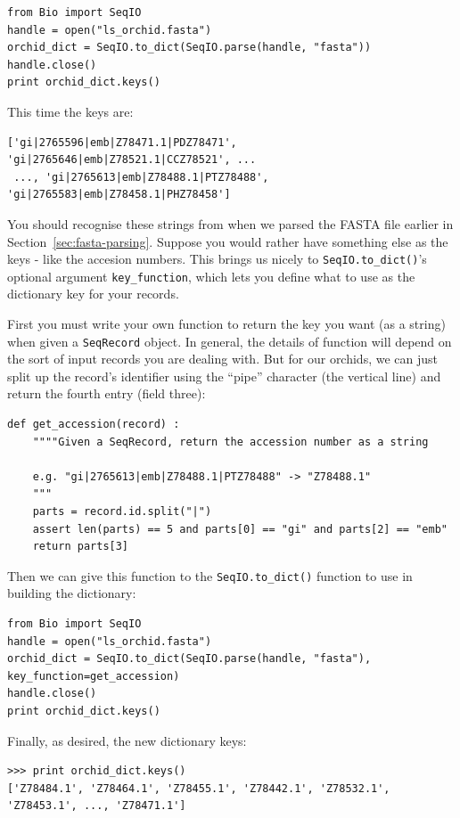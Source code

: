 \documentclass{report}
\begin{document}
\begin{verbatim}
from Bio import SeqIO
handle = open("ls_orchid.fasta")
orchid_dict = SeqIO.to_dict(SeqIO.parse(handle, "fasta"))
handle.close()
print orchid_dict.keys()
\end{verbatim}

\noindent This time the keys are:

\begin{verbatim}
['gi|2765596|emb|Z78471.1|PDZ78471', 'gi|2765646|emb|Z78521.1|CCZ78521', ...
 ..., 'gi|2765613|emb|Z78488.1|PTZ78488', 'gi|2765583|emb|Z78458.1|PHZ78458']
\end{verbatim}

You should recognise these strings from when we parsed the FASTA file earlier in Section~\ref{sec:fasta-parsing}.  Suppose you would rather have something else as the keys - like the accesion numbers.  This brings us nicely to \verb|SeqIO.to_dict()|'s optional argument \verb|key_function|, which lets you define what to use as the dictionary key for your records.

First you must write your own function to return the key you want (as a string) when given a \verb|SeqRecord| object.  In general, the details of function will depend on the sort of input records you are dealing with.  But for our orchids, we can just split up the record's identifier using the ``pipe'' character (the vertical line) and return the fourth entry (field three):

\begin{verbatim}
def get_accession(record) :
    """"Given a SeqRecord, return the accession number as a string
  
    e.g. "gi|2765613|emb|Z78488.1|PTZ78488" -> "Z78488.1"
    """
    parts = record.id.split("|")
    assert len(parts) == 5 and parts[0] == "gi" and parts[2] == "emb"
    return parts[3]
\end{verbatim}

\noindent Then we can give this function to the \verb|SeqIO.to_dict()| function to use in building the dictionary:

\begin{verbatim}
from Bio import SeqIO
handle = open("ls_orchid.fasta")
orchid_dict = SeqIO.to_dict(SeqIO.parse(handle, "fasta"), key_function=get_accession)
handle.close()
print orchid_dict.keys()
\end{verbatim}

\noindent Finally, as desired, the new dictionary keys:

\begin{verbatim}
>>> print orchid_dict.keys()
['Z78484.1', 'Z78464.1', 'Z78455.1', 'Z78442.1', 'Z78532.1', 'Z78453.1', ..., 'Z78471.1']
\end{verbatim}
\end{document}
